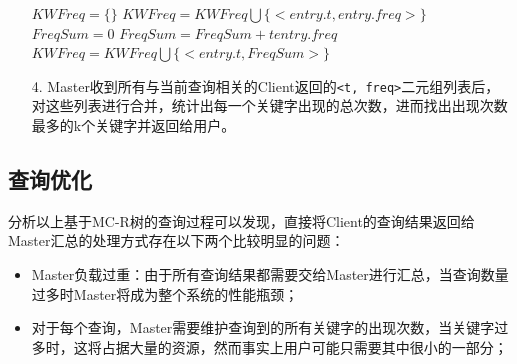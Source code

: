 \documentclass{elegantpaper}
\begin{document}
\begin{itemize}
\begin{algorithm}
\begin{algorithmic}[1]
                        \State $KWFreq = \{\}$
                                $KWFreq = KWFreq \bigcup \{<entry.t, entry.freq>\}$
                            \EndFor
                        \Else
                                \State $FreqSum = 0$
                                        \State $FreqSum = FreqSum + tentry.freq$
                                    \EndIf
                                \EndFor
                                    $KWFreq = KWFreq \bigcup \{<entry.t, FreqSum>\}$
                                \EndIf
                            \EndFor
                        \EndIf
                        \State {}
                    \EndFunction
                    
                \end{algorithmic}
                  
              \end{algorithm}
    
    \item[4.] Master收到所有与当前查询相关的Client返回的\verb|<t, freq>|二元组列表后，对这些列表进行合并，统计出每一个关键字出现的总次数，进而找出出现次数最多的k个关键字并返回给用户。

\end{itemize}

\subsection{查询优化}

分析以上基于MC-R树的查询过程可以发现，直接将Client的查询结果返回给Master汇总的处理方式存在以下两个比较明显的问题：

\begin{itemize}

    \item Master负载过重：由于所有查询结果都需要交给Master进行汇总，当查询数量过多时Master将成为整个系统的性能瓶颈；
    
    \item 对于每个查询，Master需要维护查询到的所有关键字的出现次数，当关键字过多时，这将占据大量的资源，然而事实上用户可能只需要其中很小的一部分；
    
\end{itemize}
\end{document}
